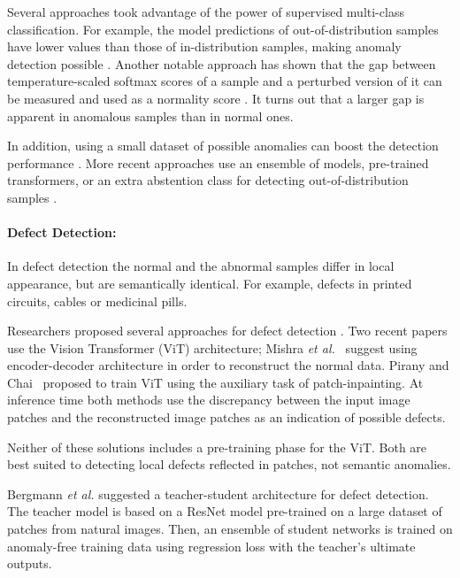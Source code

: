 \documentclass[10pt,twocolumn,letterpaper]{article}
\begin{document}
Several approaches took advantage of the power of supervised multi-class classification. For example, the model predictions of out-of-distribution samples have lower values than those of in-distribution samples, making anomaly detection possible \cite{hendrycks2016baseline}. Another notable approach has shown that the gap between temperature-scaled softmax scores of a sample and a perturbed version of it can be measured and used as a normality score \cite{liang2017enhancing}. It turns out that a larger gap is apparent in anomalous samples than in normal ones.


In addition, using a small dataset of possible anomalies can boost the detection performance \cite{hendrycks2018deep}. More recent approaches use an ensemble of models, pre-trained transformers, or an extra abstention class for detecting out-of-distribution samples \cite{vyas2018out, hendrycks2020pretrained, thulasidasan2020simple}. 

\paragraph{\bf Defect Detection:}
In defect detection the normal and the abnormal samples differ in local appearance, but are semantically identical. For example, defects in printed circuits, cables or medicinal pills.

Researchers proposed several approaches for defect detection \cite{venkataramanan2020attention, bergmann2019mvtec, bergmann2020uninformed}. Two recent papers use the Vision Transformer (ViT) architecture; Mishra {\em et al.}~\cite{mishra2021vt} suggest using encoder-decoder architecture in order to reconstruct the normal data. Pirany and Chai~\cite{pirnay2021inpainting} proposed to train ViT using the auxiliary task of patch-inpainting. At inference time both methods use the discrepancy between the input image patches and the reconstructed image patches as an indication of possible defects. 




Neither of these solutions includes a pre-training phase for the ViT. Both are best suited to detecting local defects reflected in patches, not semantic anomalies.

Bergmann \textit{et al.} \cite{bergmann2020uninformed} suggested a teacher-student architecture for defect detection. The teacher model is based on a ResNet model pre-trained on a large dataset of patches from natural images. Then, an ensemble of student networks is trained on anomaly-free training data using regression loss with the teacher’s ultimate outputs.
\end{document}
